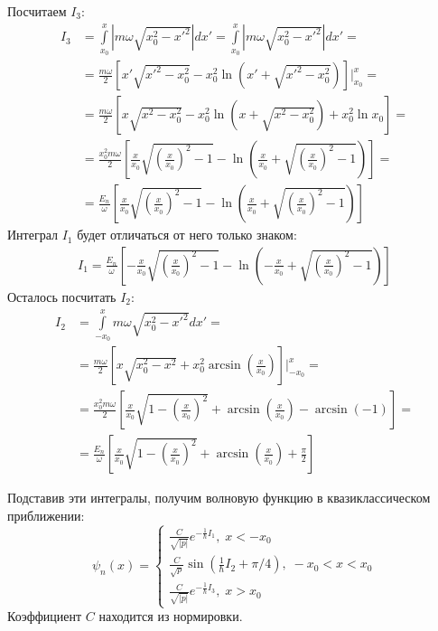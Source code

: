 Посчитаем $I_3$:
\begin{align*}
    I_3 &= \int\limits_{x_0}^{x}|m\omega\sqrt{x_0^2 - x'^2}|dx' = \int\limits_{x_0}^{x}|m\omega\sqrt{x_0^2 - x'^2}|dx' = \\
    &= \frac{m\omega}{2}\left[x'\sqrt{x'^2 - x_0^2} - x_0^2\ln (x' + \sqrt{x'^2 - x_0^2} )\right]\Bigg|_{x_0}^{x} = \\ 
    &= \frac{m\omega}{2}\left[x\sqrt{x^2 - x_0^2} - x_0^2\ln (x + \sqrt{x^2 - x_0^2} ) + x_0^2\ln x_0 \right]= \\
    &= \frac{x_0^2 m\omega}{2} \left[\frac{x}{x_0}\sqrt{\left(\frac{x}{x_0}\right)^2 - 1} - \ln (\frac{x}{x_0} + \sqrt{\left(\frac{x}{x_0}\right)^2 - 1} )\right] = \\
    &=\frac{E_n} {\omega}\left[\frac{x}{x_0}\sqrt{\left(\frac{x}{x_0}\right)^2 - 1} - \ln (\frac{x}{x_0} + \sqrt{ \left(\frac{x}{x_0}\right)^2 - 1} )\right]
\end{align*}
Интеграл $I_1$ будет отличаться от него только знаком:
\begin{align*}
    I_1 = \frac{E_n}{\omega}\left[-\frac{x}{x_0}\sqrt{\left(\frac{x}{x_0}\right)^2 - 1} - \ln (-\frac{x}{x_0} + \sqrt{ \left(\frac{x}{x_0}\right)^2 - 1} )\right]
\end{align*}
Осталось посчитать $I_2$:
\begin{align*}
    I_2 &= \int\limits_{-x_0}^{x}m\omega\sqrt{x_0^2 - x'^2}dx' = \\
    & = \frac{m\omega}{2}\left[x\sqrt{x_0^2- x^2} + x_0^2\arcsin\left(\frac{x}{x_0}\right)\right]\Bigg|_{-x_0}^{x} = \\
    & = \frac{x_0^2 m\omega}{2}\left[\frac{x}{x_0}\sqrt{1 - \left(\frac{x}{x_0}\right)^2 } + \arcsin\left(\frac{x}{x_0}\right) - \arcsin(-1)\right] = \\
    & = \frac{E_n}{\omega}\left[\frac{x}{x_0}\sqrt{1 - \left(\frac{x}{x_0}\right)^2} + \arcsin(\frac{x}{x_0}) + \frac{\pi}{2}\right]
\end{align*}


Подставив эти интегралы, получим волновую функцию в квазиклассическом приближении:
\begin{equation*}
\psi_n(x) = 
\begin{cases}
    \frac{C}{\sqrt{|p|}}e^{-\frac{1}{\hbar}I_1},\; x < -x_0\\
    \frac{C}{\sqrt{p}}\sin(\frac{1}{\hbar}I_2 + \pi/4),\; -x_0 < x < x_0\\
    \frac{C}{\sqrt{|p|}}e^{-\frac{1}{\hbar}I_3},\; x > x_0
\end{cases}
\end{equation*}
Коэффициент $C$ находится из нормировки.


